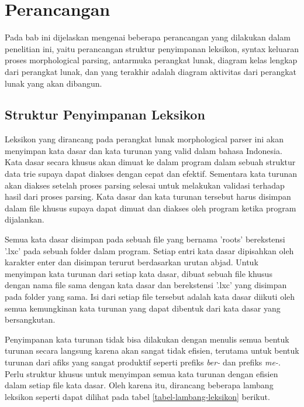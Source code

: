 \chapter{Perancangan}
\label{chap:perancangan}

Pada bab ini dijelaskan mengenai beberapa perancangan yang dilakukan dalam penelitian ini, yaitu perancangan struktur penyimpanan leksikon, syntax keluaran proses morphological parsing, antarmuka perangkat lunak, diagram kelas lengkap dari perangkat lunak, dan yang terakhir adalah diagram aktivitas dari perangkat lunak yang akan dibangun.

\section{Struktur Penyimpanan Leksikon}
\label{sec:strukturPenyimpananLeksikon}

Leksikon yang dirancang pada perangkat lunak morphological parser ini akan menyimpan kata dasar dan kata turunan yang valid dalam bahasa Indonesia. Kata dasar secara khusus akan dimuat ke dalam program dalam sebuah struktur data trie supaya dapat diakses dengan cepat dan efektif. Sementara kata turunan akan diakses setelah proses parsing selesai untuk melakukan validasi terhadap hasil dari proses parsing. Kata dasar dan kata turunan tersebut harus disimpan dalam file khusus supaya dapat dimuat dan diakses oleh program ketika program dijalankan.

Semua kata dasar disimpan pada sebuah file yang bernama 'roots' berekstensi '.lxc' pada sebuah folder dalam program. Setiap entri kata dasar dipisahkan oleh karakter enter dan disimpan terurut berdasarkan urutan abjad. Untuk menyimpan kata turunan dari setiap kata dasar, dibuat sebuah file khusus dengan nama file sama dengan kata dasar dan berekstensi '.lxc' yang disimpan pada folder yang sama. Isi dari setiap file tersebut adalah kata dasar diikuti oleh semua kemungkinan kata turunan yang dapat dibentuk dari kata dasar yang bersangkutan.

Penyimpanan kata turunan tidak bisa dilakukan dengan menulis semua bentuk turunan secara langsung karena akan sangat tidak efisien, terutama untuk bentuk turunan dari afiks yang sangat produktif seperti prefiks \textit{ber-} dan prefiks \textit{me-}. Perlu struktur khusus untuk menyimpan semua kata turunan dengan efisien dalam setiap file kata dasar. Oleh karena itu, dirancang beberapa lambang leksikon seperti dapat dilihat pada tabel \ref{tabel-lambang-leksikon} berikut.

